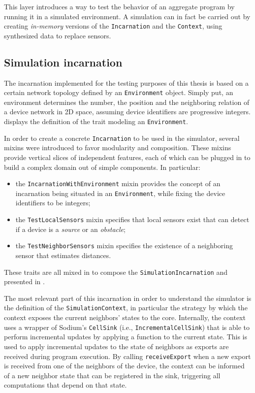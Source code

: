 This layer introduces a way to test the behavior of an aggregate program by running it in a simulated environment.
%
A simulation can in fact be carried out by creating \textit{in-memory} versions of the \texttt{Incarnation} and the \texttt{Context}, using synthesized data to replace sensors.

\subsection{Simulation incarnation}

The incarnation implemented for the testing purposes of this thesis is based on a certain network topology defined by an \texttt{Environment} object.
%
Simply put, an environment determines the number, the position and the neighboring relation of a device network in 2D space, assuming device identifiers are progressive integers.
%
 displays the definition of the trait modeling an \texttt{Environment}.
%


In order to create a concrete \texttt{Incarnation} to be used in the simulator, several mixins were introduced to favor modularity and composition.
%
These mixins provide vertical slices of independent features, each of which can be plugged in to build a complex domain out of simple components.
%
In particular:
%
\begin{itemize}
	\item the \texttt{IncarnationWithEnvironment} mixin provides the concept of an incarnation being situated in an \texttt{Environment}, while fixing the device identifiers to be integers;
	\item the \texttt{TestLocalSensors} mixin specifies that local sensors exist that can detect if a device is a \textit{source} or an \textit{obstacle};
	\item the \texttt{TestNeighborSensors} mixin specifies the existence of a neighboring sensor that estimates distances.
\end{itemize}
%
These traits are all mixed in to compose the \texttt{SimulationIncarnation} and presented in .
%

%
The most relevant part of this incarnation in order to understand the simulator is the definition of the \texttt{SimulationContext}, in particular the strategy by which the context exposes the current neighbors' states to the core.
%
Internally, the context uses a wrapper of Sodium's \texttt{CellSink} (i.e., \texttt{IncrementalCellSink}) that is able to perform incremental updates by applying a function to the current state.
%
This is used to apply incremental updates to the state of neighbors as exports are received during program execution.
%
By calling \texttt{receiveExport} when a new export is received from one of the neighbors of the device, the context can be informed of a new neighbor state that can be registered in the sink, triggering all computations that depend on that state.

